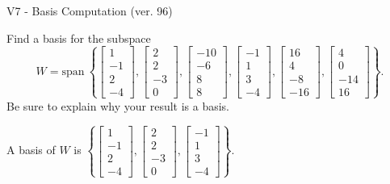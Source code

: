 \begin{exercise}
  \begin{exerciseTitle}V7 - Basis Computation (ver. 96)\end{exerciseTitle}
  \begin{exerciseStatement}
    Find a basis for the subspace 
\[W=\mathrm{span}\ \left\{\left[\begin{array}{r}
1 \\
-1 \\
2 \\
-4
\end{array}\right] , \left[\begin{array}{r}
2 \\
2 \\
-3 \\
0
\end{array}\right] , \left[\begin{array}{r}
-10 \\
-6 \\
8 \\
8
\end{array}\right] , \left[\begin{array}{r}
-1 \\
1 \\
3 \\
-4
\end{array}\right] , \left[\begin{array}{r}
16 \\
4 \\
-8 \\
-16
\end{array}\right] , \left[\begin{array}{r}
4 \\
0 \\
-14 \\
16
\end{array}\right]\right\}.\]
 Be sure to explain why your result is a basis.


  \end{exerciseStatement}
  \begin{exerciseAnswer}
   A basis of \(W\) is  \(\left\{\left[\begin{array}{r}
1 \\
-1 \\
2 \\
-4
\end{array}\right] , \left[\begin{array}{r}
2 \\
2 \\
-3 \\
0
\end{array}\right] , \left[\begin{array}{r}
-1 \\
1 \\
3 \\
-4
\end{array}\right]\right\}\).
  


  \end{exerciseAnswer}
\end{exercise}